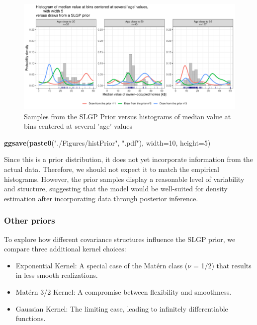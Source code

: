 \documentclass[
]{article}
\newenvironment{Shaded}{\begin{snugshade}}{\end{snugshade}}
\newcommand{\AttributeTok}[1]{\textcolor[rgb]{0.13,0.29,0.53}{#1}}
\newcommand{\DecValTok}[1]{\textcolor[rgb]{0.00,0.00,0.81}{#1}}
\newcommand{\FunctionTok}[1]{\textcolor[rgb]{0.13,0.29,0.53}{\textbf{#1}}}
\newcommand{\NormalTok}[1]{#1}
\newcommand{\StringTok}[1]{\textcolor[rgb]{0.31,0.60,0.02}{#1}}
\providecommand{\tightlist}{%
  \setlength{\itemsep}{0pt}\setlength{\parskip}{0pt}}
\begin{document}
\begin{figure}[H]

{\centering \includegraphics{IntroductionSLGP_files/figure-latex/SLGPplottingPrior2-1} 

}

\caption{Samples from the SLGP Prior versus histograms of median value at bins centered at several 'age' values}\label{fig:SLGPplottingPrior2}
\end{figure}

\begin{Shaded}
\begin{Highlighting}[]

\FunctionTok{ggsave}\NormalTok{(}\FunctionTok{paste0}\NormalTok{(}\StringTok{"./Figures/histPrior"}\NormalTok{,  }\StringTok{".pdf"}\NormalTok{), }\AttributeTok{width=}\DecValTok{10}\NormalTok{, }\AttributeTok{height=}\DecValTok{5}\NormalTok{)}
\end{Highlighting}
\end{Shaded}

Since this is a prior distribution, it does not yet incorporate information from the actual data. Therefore, we should not expect it to match the empirical histograms. However, the prior samples display a reasonable level of variability and structure, suggesting that the model would be well-suited for density estimation after incorporating data through posterior inference.

\subsubsection{Other priors}\label{other-priors}

To explore how different covariance structures influence the SLGP prior, we compare three additional kernel choices:

\begin{itemize}
\tightlist
\item
  Exponential Kernel: A special case of the Matérn class (\(\nu\) = 1/2) that results in less smooth realizations.
\item
  Matérn 3/2 Kernel: A compromise between flexibility and smoothness.
\item
  Gaussian Kernel: The limiting case, leading to infinitely differentiable functions.
\end{itemize}
\end{document}
